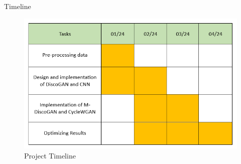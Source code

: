 \documentclass[xcolor=dvipsnames]{beamer}
\begin{document}
\begin{frame}{Timeline}
\begin{figure}
    \centering
    \includegraphics[scale = 0.5]{timeline-chart.png}
    \caption{Project Timeline}
    \label{fig:enter-label}
\end{figure}
\end{frame}
\end{document}
